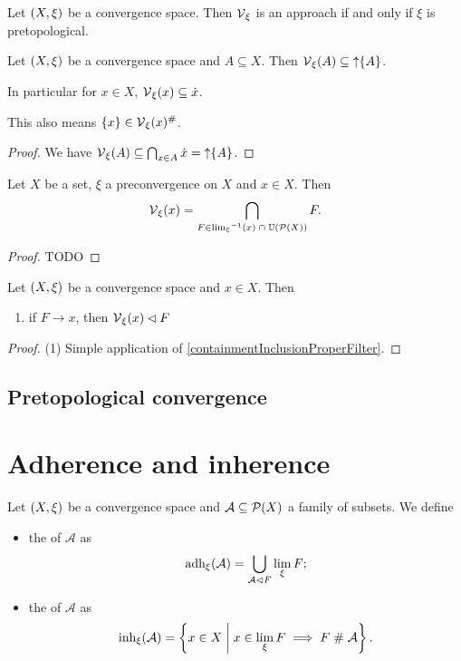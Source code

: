 \begin{lemma}
Let $\left( X,\xi \right)$ be a convergence space. Then $\operatorname{\mathcal{V}}_\xi$ is an approach \textup{if and only if} $\xi$ is pretopological.
\end{lemma}

\begin{lemma}
Let $\left( X,\xi \right)$ be a convergence space and $A\subseteq X$. Then $\operatorname{\mathcal{V}}_\xi(A) \subseteq \operatorname{\uparrow}\{A\}$.

In particular for $x\in X$, $\operatorname{\mathcal{V}}_\xi(x) \subseteq \dot{x}$.
\end{lemma}
This also means $\{x\}\in\operatorname{\mathcal{V}}_\xi(x)^{\mathrel{\#}}$.
\begin{proof}
We have $\operatorname{\mathcal{V}}_\xi(A) \subseteq \bigcap_{x\in A}\dot{x} = \operatorname{\uparrow} \{A\}$. 
\end{proof}

\begin{lemma}
Let $X$ be a set, $\xi$ a preconvergence on $X$ and $x\in X$. Then
\[ \operatorname{\mathcal{V}}_\xi(x) = \bigcap_{F\in {\lim_\xi}^{-1}(x)\;\cap\; \operatorname{\mathbb{U}}(\operatorname{\mathcal{P}}(X))}F. \]
\end{lemma}
\begin{proof}
TODO
\end{proof}

\begin{lemma}
Let $\left( X,\xi \right)$ be a convergence space and $x\in X$. Then
\begin{enumerate}
\item if $F\to x$, then $\operatorname{\mathcal{V}}_\xi(x)\lhd F$
\end{enumerate}
\end{lemma}
\begin{proof}
(1) Simple application of \ref{containmentInclusionProperFilter}.
\end{proof}

\subsection{Pretopological convergence}


\section{Adherence and inherence}
\begin{definition}
Let $\left( X,\xi \right)$ be a convergence space and $\mathcal{A}\subseteq \operatorname{\mathcal{P}}(X)$ a family of subsets. We define
\begin{itemize}
\item the  of $\mathcal{A}$ as
\[ \operatorname{adh}_\xi(\mathcal{A}) = \bigcup_{\mathcal{A}\lhd F}\lim_\xi F; \]
\item the  of $\mathcal{A}$ as
\[ \operatorname{inh}_\xi(\mathcal{A}) = \left\{ x\in X \;\middle|\; x\in \lim_\xi F \implies F\mathrel{\#}\mathcal{A} \right\}. \]
\end{itemize}
\end{definition}

